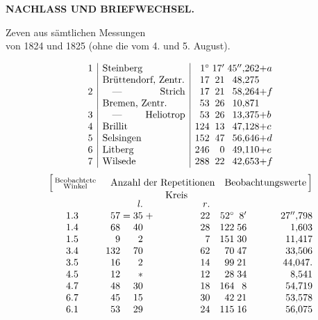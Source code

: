 \par\clearpage
\null\thispagestyle{empty}

\par\clearpage
\thispagestyle{empty}
\vspace*{2.8\baselineskip}
{\centering\Large\bfseries NACHLASS UND BRIEFWECHSEL.\par}
\vspace{3.3\baselineskip}
{\centering
[1.]\par{} Zeven aus sämtlichen Messungen\\
von 1824 und 1825 (ohne die vom 4. und 5. August).\par{}\par}
\[
\begin{array}{@{}r|l|r@{\;}r@{\;}r@{}l@{}}
 1&\text{Steinberg}&1^\circ&17'&45''{,}262&+a\\
 &\text{Brüttendorf, Zentr.}&17&21&48{,}275&\\
 2&\text{\hbox to 8.5em{\quad—\hfil Strich}}&17&21&58{,}264&+f\\
 &\text{Bremen, Zentr.}&53&26&10{,}871&\\
 3&\text{\hbox to 8.5em{\quad—\hfil Heliotrop}}&53&26&13{,}375&+b\\
 4&\text{Brillit}&124&13&47{,}128&+c\\
 5&\text{Selsingen}&152&47&56{,}646&+d\\
 6&\text{Litberg}&246&0&49{,}110&+e\\
 7&\text{Wilsede}&288&22&42{,}653&+f
\end{array}
\]
{\small
\[
\begin{array}{@{}c@{\quad}r@{\;}c@{\;}r@{\;}c@{\;}r@{\quad}r@{\;}r@{\;}r@{}}
 \Bigl[\,\substack{\text{Beobachtete}\\\text{Winkel}}&
 \multicolumn{5}{c}{\text{Anzahl der Repetitionen}}&
 \multicolumn{3}{c@{}}{\text{Beobachtungswerte}\,\Bigr]}\\[-2pt]
 &&&\multicolumn{3}{c}{\text{Kreis}}&&&\\[-3pt]
 &&&\mathit{l.}&&\mathit{r.}&&&\\
 1.3&57&=&35&+&22&52^\circ&8'&27''{,}798\\
 1.4&68&&40&&28&122&56&1{,}603\\
 1.5&9&&2&&7&151&30&11{,}417\\
 3.4&132&&70&&62&70&47&33{,}506\\
 3.5&16&&2&&14&99&21&44{,}047.\\
 4.5&12&&\ast&&12&28&34&8{,}541\\
 4.7&48&&30&&18&164&8&54{,}719\\
 6.7&45&&15&&30&42&21&53{,}578\\
 6.1&53&&29&&24&115&16&56{,}075
\end{array}
\]
}

